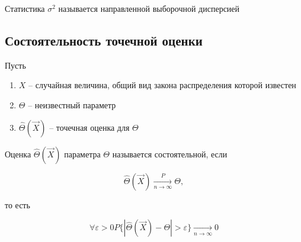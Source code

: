 \begin{defenition}
    Статистика $\sigma^2$ называется направленной выборочной дисперсией
\end{defenition}

\subsection{Состоятельность точечной оценки}

\begin{defenition}
    Пусть

    \begin{enumerate}
        \item $X$ -- случайная величина, общий вид закона распределения
            которой известен
        \item $\Theta$ -- неизвестный параметр
        \item $\hat \Theta(\vec X)$ -- точечная оценка для $\Theta$
    \end{enumerate}

    Оценка $\hat \Theta(\vec X)$ параметра $\Theta$ называется
    состоятельной, если

    \begin{equation*}
        \hat \Theta(\vec X) \xrightarrow[n \to \infty]{P}  \Theta,
    \end{equation*}

    то есть

    \begin{equation*}
        \forall \varepsilon > 0 P\{|\hat \Theta(\vec X) -
        \Theta| > \varepsilon \} \xrightarrow[n \to \infty]{} 0
    \end{equation*}
\end{defenition}

